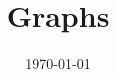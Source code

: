 \documentclass[10pt,a4paper]{article} %
\begin{document}
\title{Graphs}
\date{\today}
\maketitle
\end{document}
